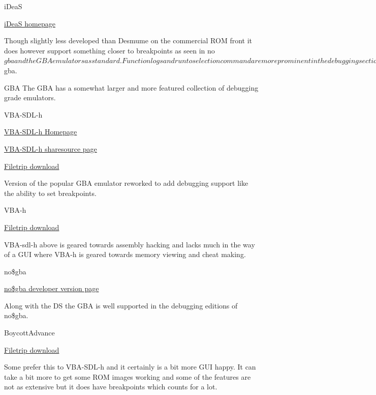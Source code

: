 \documentclass[
]{book}
\begin{document}
iDeaS

\href{http://ciacin.site90.com/ideas.php}{iDeaS homepage}

Though slightly less developed than Desmume on the commercial ROM front it does however support something closer to breakpoints as seen in no\(gba and the GBA emulators as standard. Function logs and run to selection command are more prominent in the debugging section though and it is not quite a full replacement for no\)gba.

GBA The GBA has a somewhat larger and more featured collection of debugging grade emulators.

VBA-SDL-h

\href{http://labmaster.bios.net.nz/vba-sdl-h/}{VBA-SDL-h Homepage}

\href{http://sharesource.org/project/vbasdlh/}{VBA-SDL-h sharesource page}

\href{http://filetrip.net/gba-downloads/emulators/download-vba-sdl-h-r070904a-f28914.html}{Filetrip download}

Version of the popular GBA emulator reworked to add debugging support like the ability to set breakpoints.

VBA-h

\href{http://filetrip.net/gba-downloads/emulators/download-vba-h-172-f28913.html}{Filetrip download}

VBA-sdl-h above is geared towards assembly hacking and lacks much in the way of a GUI where VBA-h is geared towards memory viewing and cheat making.

no\$gba

\href{http://problemkaputt.de/gba-dev.htm}{no\$gba developer version page}

Along with the DS the GBA is well supported in the debugging editions of no\$gba.

BoycottAdvance

\href{http://filetrip.net/gba-downloads/emulators/download-boycottadvance-028-windows-f28912.html}{Filetrip download}

Some prefer this to VBA-SDL-h and it certainly is a bit more GUI happy. It can take a bit more to get some ROM images working and some of the features are not as extensive but it does have breakpoints which counts for a lot.
\end{document}
